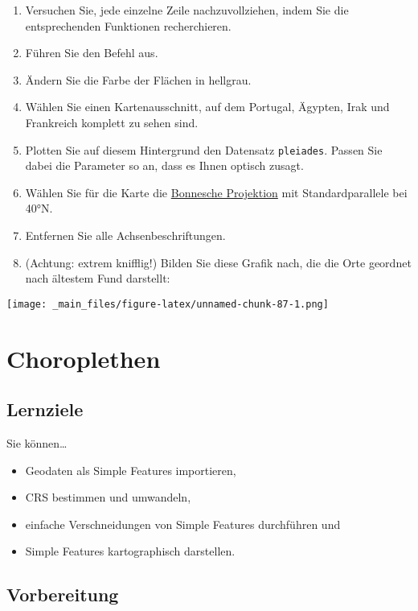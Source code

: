 \documentclass[11pt,german,a4paper]{article}
\providecommand{\tightlist}{%
  \setlength{\itemsep}{0pt}\setlength{\parskip}{0pt}}
\begin{document}
\begin{enumerate}
\def\labelenumi{\arabic{enumi}.}
\setcounter{enumi}{8}
\item
  Versuchen Sie, jede einzelne Zeile nachzuvollziehen, indem Sie die entsprechenden Funktionen recherchieren.
\item
  Führen Sie den Befehl aus.
\item
  Ändern Sie die Farbe der Flächen in hellgrau.
\item
  Wählen Sie einen Kartenausschnitt, auf dem Portugal, Ägypten, Irak und Frankreich komplett zu sehen sind.
\item
  Plotten Sie auf diesem Hintergrund den Datensatz \texttt{pleiades}. Passen Sie dabei die Parameter so an, dass es Ihnen optisch zusagt.
\item
  Wählen Sie für die Karte die \href{https://de.wikipedia.org/wiki/Bonnesche_Projektion}{Bonnesche Projektion} mit Standardparallele bei 40°N.
\item
  Entfernen Sie alle Achsenbeschriftungen.
\item
  (Achtung: extrem knifflig!) Bilden Sie diese Grafik nach, die die Orte geordnet nach ältestem Fund darstellt:
\end{enumerate}

\texttt{[image: \_main\_files/figure-latex/unnamed-chunk-87-1.png]}

\hypertarget{choroplethen}{%
\section{Choroplethen}\label{choroplethen}}

\hypertarget{lernziele}{%
\subsection{Lernziele}\label{lernziele}}

Sie können\ldots{}

\begin{itemize}
\tightlist
\item
  Geodaten als Simple Features importieren,
\item
  CRS bestimmen und umwandeln,
\item
  einfache Verschneidungen von Simple Features durchführen und
\item
  Simple Features kartographisch darstellen.
\end{itemize}

\hypertarget{vorbereitung-1}{%
\subsection{Vorbereitung}\label{vorbereitung-1}}
\end{document}
